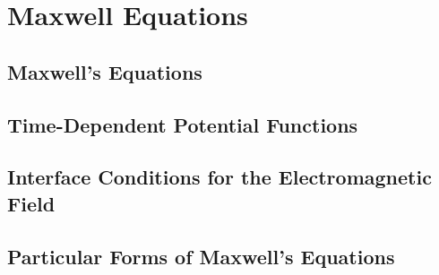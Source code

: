 \section{Maxwell Equations}

\subsection{Maxwell's Equations}

\subsection{Time-Dependent Potential Functions}

\subsection{Interface Conditions for the Electromagnetic Field}

\subsection{Particular Forms of Maxwell's Equations}
